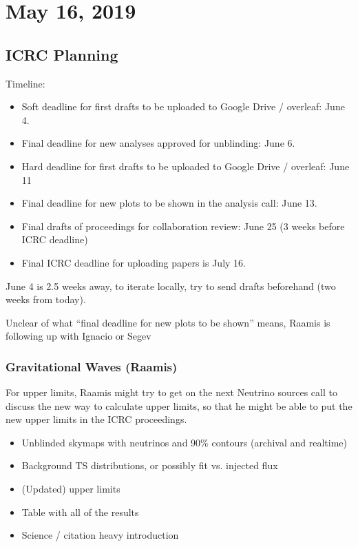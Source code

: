 \chapter{May 16, 2019}

\section{ICRC Planning}
Timeline:
\begin{itemize}
    \itemsep-0.85em 
    \item Soft deadline for first drafts to be uploaded to Google Drive / overleaf: June 4.
    \item Final deadline for new analyses approved for unblinding: June 6.
    \item Hard deadline for first drafts to be uploaded to Google Drive / overleaf: June 11
    \item Final deadline for new plots to be shown in the analysis call: June 13.
    \item Final drafts of proceedings for collaboration review: June 25 (3 weeks before ICRC deadline)
    \item Final ICRC deadline for uploading papers is July 16.
\end{itemize}

June 4 is 2.5 weeks away, to iterate locally, try to send drafts beforehand (two weeks from today).

Unclear of what ``final deadline for new plots to be shown'' means, Raamis is following up with Ignacio or Segev


\subsection{Gravitational Waves (Raamis)}
For upper limits, Raamis might try to get on the next Neutrino sources call to discuss the new way to calculate upper limits, so that he might be able to put the new upper limits in the ICRC proceedings. 
\begin{itemize}
    \itemsep-0.85em 
    \item Unblinded skymaps with neutrinos and 90\% contours (archival and realtime)
    \item Background TS distributions, or possibly fit vs. injected flux
    \item (Updated) upper limits
    \item Table with all of the results
    \item Science / citation heavy introduction
\end{itemize}

